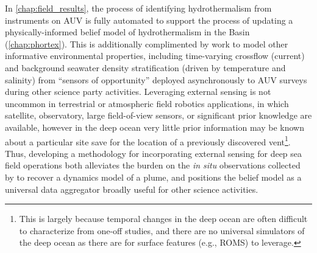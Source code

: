 In \cref{chap:field_results}, the process of identifying hydrothermalism from instruments on AUV \Sentry is fully automated to support the process of updating a physically-informed belief model of hydrothermalism in the Basin (\cref{chap:phortex}).
This is additionally complimented by work to model other informative environmental properties, including time-varying crossflow (current) and background seawater density stratification (driven by temperature and salinity) from ``sensors of opportunity'' deployed asynchronously to AUV \Sentry surveys during other science party activities.
Leveraging external sensing is not uncommon in terrestrial or atmospheric field robotics applications, in which satellite, observatory, large field-of-view sensors, or significant prior knowledge are available\autocite{everett2019planning,heaney2007nonlinear,desaraju2015vision}, however in the deep ocean very little prior information may be known about a particular site save for the location of a previously discovered vent\footnote{This is largely because temporal changes in the deep ocean are often difficult to characterize from one-off studies, and there are no universal simulators of the deep ocean as there are for surface features (e.g., ROMS) to leverage.}.
Thus, developing a methodology for incorporating external sensing for deep sea field operations both alleviates the burden on the \emph{in situ} observations collected by \Sentry to recover a dynamics model of a plume, and positions the belief model as a universal data aggregator broadly useful for other science activities.


